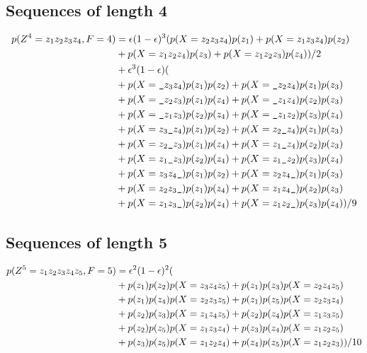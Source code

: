 \subsection{Sequences of length 4}

\begin{align*}
    p(Z^4=z_1z_2z_3z_4,F=4) &= \eps(1-\eps)^3 (p(X=z_2z_3z_4)p(z_1)+p(X=z_1z_3z_4)p(z_2)\\
        &+p(X=z_1z_2z_4)p(z_3)+p(X=z_1z_2z_3)p(z_4))/2\\
        &+\eps^3(1-\eps)(\\
        &+ p(X=\s z_3z_4)p(z_1)p(z_2) + p(X=\s z_2z_4)p(z_1)p(z_3)\\
        &+ p(X=\s z_2z_3)p(z_1)p(z_4) + p(X=\s z_1z_4)p(z_2)p(z_3)\\
        &+ p(X=\s z_1z_3)p(z_2)p(z_4) + p(X=\s z_1z_2)p(z_3)p(z_4)\\
        &+ p(X=z_3\s z_4)p(z_1)p(z_2) + p(X=z_2\s z_4)p(z_1)p(z_3)\\
        &+ p(X=z_2\s z_3)p(z_1)p(z_4) + p(X=z_1\s z_4)p(z_2)p(z_3)\\
        &+ p(X=z_1\s z_3)p(z_2)p(z_4) + p(X=z_1\s z_2)p(z_3)p(z_4)\\
        &+ p(X=z_3z_4\s)p(z_1)p(z_2) + p(X=z_2z_4\s)p(z_1)p(z_3)\\
        &+ p(X=z_2z_3\s)p(z_1)p(z_4) + p(X=z_1z_4\s)p(z_2)p(z_3)\\
        &+ p(X=z_1z_3\s)p(z_2)p(z_4) + p(X=z_1z_2\s)p(z_3)p(z_4))/9
\end{align*}

\subsection{Sequences of length 5}

\begin{align*}
    p(Z^5=z_1z_2z_3z_4z_5,F=5)
        &= \epsilon^2(1-\epsilon)^2(\\
        &+p(z_1)p(z_2)p(X=z_3z_4z_5)+p(z_1)p(z_3)p(X=z_2z_4z_5)\\
        &+p(z_1)p(z_4)p(X=z_2z_3z_5)+p(z_1)p(z_5)p(X=z_2z_3z_4)\\
        &+p(z_2)p(z_3)p(X=z_1z_4z_5)+p(z_2)p(z_4)p(X=z_1z_3z_5)\\
        &+p(z_2)p(z_5)p(X=z_1z_3z_4)+p(z_3)p(z_4)p(X=z_1z_2z_5)\\
        &+p(z_3)p(z_5)p(X=z_1z_2z_4)+p(z_4)p(z_5)p(X=z_1z_2z_3))/10
\end{align*}
